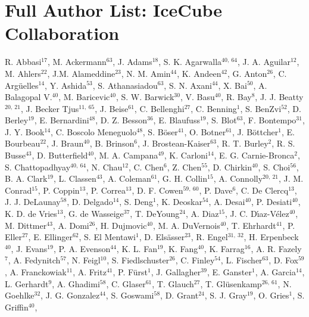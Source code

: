\section*{Full Author List: IceCube Collaboration}

\scriptsize
\noindent
R. Abbasi$^{17}$,
M. Ackermann$^{63}$,
J. Adams$^{18}$,
S. K. Agarwalla$^{40,\: 64}$,
J. A. Aguilar$^{12}$,
M. Ahlers$^{22}$,
J.M. Alameddine$^{23}$,
N. M. Amin$^{44}$,
K. Andeen$^{42}$,
G. Anton$^{26}$,
C. Arg{\"u}elles$^{14}$,
Y. Ashida$^{53}$,
S. Athanasiadou$^{63}$,
S. N. Axani$^{44}$,
X. Bai$^{50}$,
A. Balagopal V.$^{40}$,
M. Baricevic$^{40}$,
S. W. Barwick$^{30}$,
V. Basu$^{40}$,
R. Bay$^{8}$,
J. J. Beatty$^{20,\: 21}$,
J. Becker Tjus$^{11,\: 65}$,
J. Beise$^{61}$,
C. Bellenghi$^{27}$,
C. Benning$^{1}$,
S. BenZvi$^{52}$,
D. Berley$^{19}$,
E. Bernardini$^{48}$,
D. Z. Besson$^{36}$,
E. Blaufuss$^{19}$,
S. Blot$^{63}$,
F. Bontempo$^{31}$,
J. Y. Book$^{14}$,
C. Boscolo Meneguolo$^{48}$,
S. B{\"o}ser$^{41}$,
O. Botner$^{61}$,
J. B{\"o}ttcher$^{1}$,
E. Bourbeau$^{22}$,
J. Braun$^{40}$,
B. Brinson$^{6}$,
J. Brostean-Kaiser$^{63}$,
R. T. Burley$^{2}$,
R. S. Busse$^{43}$,
D. Butterfield$^{40}$,
M. A. Campana$^{49}$,
K. Carloni$^{14}$,
E. G. Carnie-Bronca$^{2}$,
S. Chattopadhyay$^{40,\: 64}$,
N. Chau$^{12}$,
C. Chen$^{6}$,
Z. Chen$^{55}$,
D. Chirkin$^{40}$,
S. Choi$^{56}$,
B. A. Clark$^{19}$,
L. Classen$^{43}$,
A. Coleman$^{61}$,
G. H. Collin$^{15}$,
A. Connolly$^{20,\: 21}$,
J. M. Conrad$^{15}$,
P. Coppin$^{13}$,
P. Correa$^{13}$,
D. F. Cowen$^{59,\: 60}$,
P. Dave$^{6}$,
C. De Clercq$^{13}$,
J. J. DeLaunay$^{58}$,
D. Delgado$^{14}$,
S. Deng$^{1}$,
K. Deoskar$^{54}$,
A. Desai$^{40}$,
P. Desiati$^{40}$,
K. D. de Vries$^{13}$,
G. de Wasseige$^{37}$,
T. DeYoung$^{24}$,
A. Diaz$^{15}$,
J. C. D{\'\i}az-V{\'e}lez$^{40}$,
M. Dittmer$^{43}$,
A. Domi$^{26}$,
H. Dujmovic$^{40}$,
M. A. DuVernois$^{40}$,
T. Ehrhardt$^{41}$,
P. Eller$^{27}$,
E. Ellinger$^{62}$,
S. El Mentawi$^{1}$,
D. Els{\"a}sser$^{23}$,
R. Engel$^{31,\: 32}$,
H. Erpenbeck$^{40}$,
J. Evans$^{19}$,
P. A. Evenson$^{44}$,
K. L. Fan$^{19}$,
K. Fang$^{40}$,
K. Farrag$^{16}$,
A. R. Fazely$^{7}$,
A. Fedynitch$^{57}$,
N. Feigl$^{10}$,
S. Fiedlschuster$^{26}$,
C. Finley$^{54}$,
L. Fischer$^{63}$,
D. Fox$^{59}$,
A. Franckowiak$^{11}$,
A. Fritz$^{41}$,
P. F{\"u}rst$^{1}$,
J. Gallagher$^{39}$,
E. Ganster$^{1}$,
A. Garcia$^{14}$,
L. Gerhardt$^{9}$,
A. Ghadimi$^{58}$,
C. Glaser$^{61}$,
T. Glauch$^{27}$,
T. Gl{\"u}senkamp$^{26,\: 61}$,
N. Goehlke$^{32}$,
J. G. Gonzalez$^{44}$,
S. Goswami$^{58}$,
D. Grant$^{24}$,
S. J. Gray$^{19}$,
O. Gries$^{1}$,
S. Griffin$^{40}$,
